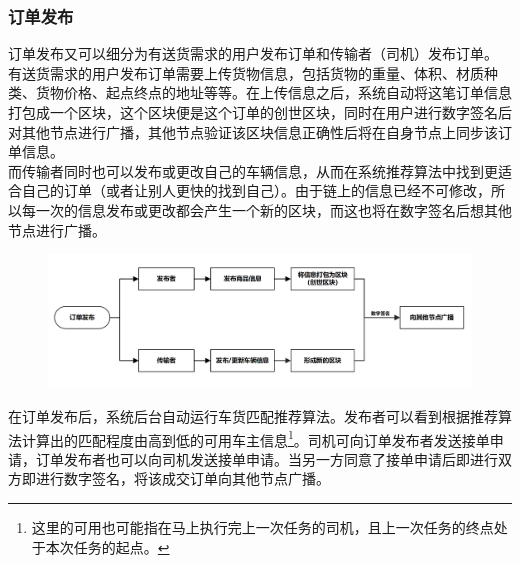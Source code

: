 \documentclass[UTF8]{ctexart}
\begin{document}
\begin{multicols}{2}
  \subsubsection{订单发布}
  订单发布又可以细分为有送货需求的用户发布订单和传输者（司机）发布订单。\\
  \indent 有送货需求的用户发布订单需要上传货物信息，包括货物的重量、体积、材质种类、货物价格、起点终点的地址等等。在上传信息之后，系统自动将这笔订单信息打包成一个区块，这个区块便是这个订单的创世区块，同时在用户进行数字签名后对其他节点进行广播，其他节点验证该区块信息正确性后将在自身节点上同步该订单信息。\\
  \indent 而传输者同时也可以发布或更改自己的车辆信息，从而在系统推荐算法中找到更适合自己的订单（或者让别人更快的找到自己）。由于链上的信息已经不可修改，所以每一次的信息发布或更改都会产生一个新的区块，而这也将在数字签名后想其他节点进行广播。
  \renewcommand{\figurename}{\heiti\small图\songti}
  \begin{figure}[H]
    \centering
    \includegraphics[width=1.1\linewidth]{image/order.png}
    \caption{\heiti{}\songti}
  \end{figure}
  在订单发布后，系统后台自动运行车货匹配推荐算法。发布者可以看到根据推荐算法计算出的匹配程度由高到低的可用车主信息\footnote{这里的可用也可能指在马上执行完上一次任务的司机，且上一次任务的终点处于本次任务的起点。}。司机可向订单发布者发送接单申请，订单发布者也可以向司机发送接单申请。当另一方同意了接单申请后即进行双方即进行数字签名，将该成交订单向其他节点广播。

\end{multicols}
\end{document}
